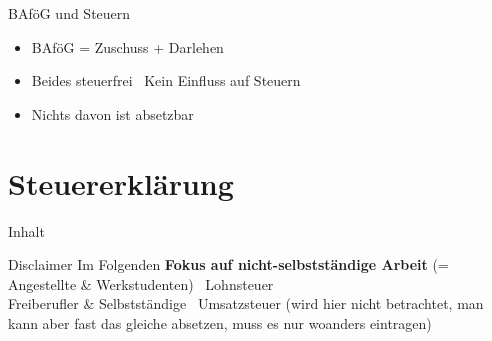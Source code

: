 \documentclass{beamer}
\newcommand{\n}{\hfill\\\vspace{0.25cm}}
\begin{document}
		\begin{frame}{BAföG und Steuern}
			\begin{itemize}
				\item BAföG = Zuschuss + Darlehen
				\item Beides steuerfrei \textrightarrow\ Kein Einfluss auf Steuern
				\item Nichts davon ist absetzbar
			\end{itemize}
		\end{frame}
	
	\section{Steuererklärung}
	
		\begin{frame}[t]{Inhalt}
		\end{frame}
	
		\begin{frame}{Disclaimer}
			Im Folgenden \textbf{Fokus auf nicht-selbstständige Arbeit} (= Angestellte \& Werkstudenten) \textrightarrow\ Lohnsteuer\n\pause\footnotesize
			Freiberufler \& Selbstständige \textrightarrow\ Umsatzsteuer (wird hier nicht betrachtet, man kann aber fast das gleiche absetzen, muss es nur woanders eintragen)
		\end{frame}
	
\end{document}
